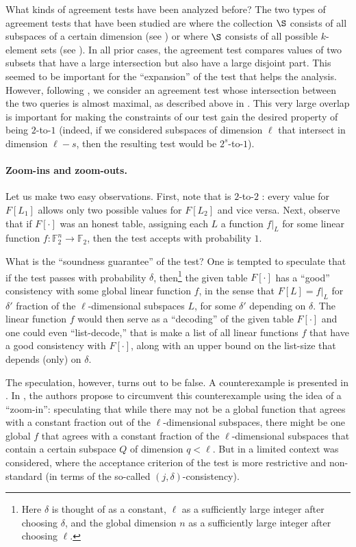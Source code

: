 \documentclass{toc}
\def\F{\mathbb{F}}
\begin{document}
%

What kinds of agreement tests have been analyzed before? The two types of agreement tests that have been studied are where the collection $\S$ consists of all subspaces of a certain dimension (see \cite{RaSa,AS03,IKW}) or where $\S$ consists of all possible $k$-element sets (see \cite{DR06,DG08,IKW,DS14}). In all prior cases, the agreement test compares values of two subsets that have a large intersection but also have a large disjoint part. This seemed to be important for the ``expansion'' of the test that helps the analysis.
However, following \cite{KMS}, we consider an agreement test whose intersection between the two queries is almost maximal, as described above in . This very large overlap is important for making the constraints of our test gain the desired property of being $2$-to-$1$
(indeed, if we considered subspaces of dimension $\ell$ that intersect in dimension $\ell - s$, then the resulting test would be $2^s$-to-$1$).

\paragraph{Zoom-ins and zoom-outs.} Let us make two easy observations. First, note that
 is $2$-to-$2$ : every value for $F[L_1]$ allows only two possible values for $F[L_2]$ and vice versa. Next, observe that if $F[\cdot]$ was an honest table, assigning each $L$ a function $f|_L$ for some linear function $f:\F_2^n\to\F_2$, then the test accepts with probability $1$.

What is the ``soundness guarantee'' of the test? One is tempted to speculate that
if the test passes with probability $\delta$, then\footnote{Here $\delta$ is
  thought of as a constant, $\ell$ as a sufficiently large integer after
  choosing $\delta$, and the global dimension $n$ as a sufficiently large
  integer after choosing $\ell$.}  the given table $F[\cdot]$ has a ``good''
consistency with some global linear function $f$, in the sense that $F[L]= f|_L$
for $\delta'$ fraction of the $\ell$-dimensional subspaces $L$, for some
$\delta'$ depending on $\delta$. The linear function $f$ would then serve as a
``decoding'' of the given table $F[\cdot]$ and one could even ``list-decode,''
that is make a list of all linear functions $f$ that have a good consistency with
$F[\cdot]$, along with an upper bound on the list-size that depends (only) on
$\delta$.

\medskip The speculation, however, turns out to be false. A counterexample is
presented in . In \cite{KMS}, the authors propose to
circumvent this counterexample using the idea of a ``zoom-in'': speculating that
while there may not be a global function that agrees with a constant fraction
out of the $\ell$-dimensional subspaces, there might be one global $f$ that
agrees with a constant fraction of the $\ell$-dimensional subspaces that contain
a certain subspace $Q$ of dimension $q<\ell$. But in \cite{KMS} a limited
context was considered, where the acceptance criterion of the test is more
restrictive and non-standard (in terms of the so-called
$(j,\delta)$-consistency).
\end{document}
